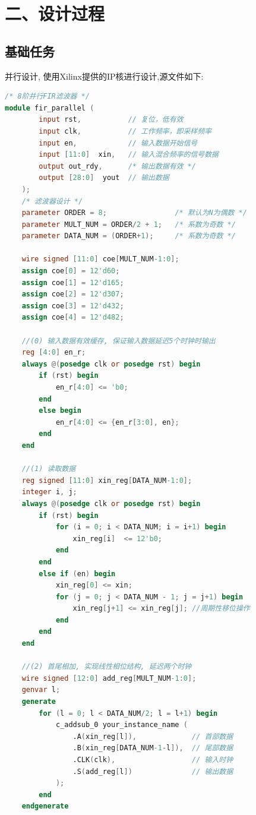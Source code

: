 \documentclass{article}
\newcommand{\fourhao}{\fontsize{14pt}{\baselineskip}\selectfont} %
\newcommand{\xiaosihao}{\fontsize{12pt}{\baselineskip}\selectfont} %
\begin{document}
\section*{\fourhao 二、设计过程}
\xiaosihao
{}
\subsection*{基础任务}
并行设计, 使用Xilinx提供的IP核进行设计,源文件如下:
\begin{lstlisting}[language=Verilog, caption={并行八阶FIR滤波器}]
/* 8阶并行FIR滤波器 */
module fir_parallel (
        input rst,           // 复位，低有效
        input clk,           // 工作频率，即采样频率
        input en,            // 输入数据开始信号
        input [11:0]  xin,   // 输入混合频率的信号数据
        output out_rdy,      /* 输出数据有效 */
        output [28:0]  yout  // 输出数据
    );
    /* 滤波器设计 */
    parameter ORDER = 8;                /* 默认为N为偶数 */
    parameter MULT_NUM = ORDER/2 + 1;   /* 系数为奇数 */
    parameter DATA_NUM = (ORDER+1);     /* 系数为奇数 */

    wire signed [11:0] coe[MULT_NUM-1:0];
    assign coe[0] = 12'd60;
    assign coe[1] = 12'd165;
    assign coe[2] = 12'd307;
    assign coe[3] = 12'd432;
    assign coe[4] = 12'd482;

    //(0) 输入数据有效缓存, 保证输入数据延迟5个时钟时输出
    reg [4:0] en_r;
    always @(posedge clk or posedge rst) begin
        if (rst) begin
            en_r[4:0] <= 'b0;
        end
        else begin
            en_r[4:0] <= {en_r[3:0], en};
        end
    end

    //(1) 读取数据
    reg signed [11:0] xin_reg[DATA_NUM-1:0];
    integer i, j;
    always @(posedge clk or posedge rst) begin
        if (rst) begin
            for (i = 0; i < DATA_NUM; i = i+1) begin
                xin_reg[i]  <= 12'b0;
            end
        end
        else if (en) begin
            xin_reg[0] <= xin;
            for (j = 0; j < DATA_NUM - 1; j = j+1) begin
                xin_reg[j+1] <= xin_reg[j]; //周期性移位操作
            end
        end
    end

    //(2) 首尾相加, 实现线性相位结构, 延迟两个时钟
    wire signed [12:0] add_reg[MULT_NUM-1:0];
    genvar l;
    generate
        for (l = 0; l < DATA_NUM/2; l = l+1) begin
            c_addsub_0 your_instance_name (
                .A(xin_reg[l]),             // 首部数据
                .B(xin_reg[DATA_NUM-1-l]),  // 尾部数据
                .CLK(clk),                  // 输入时钟
                .S(add_reg[l])              // 输出数据
            );
        end
    endgenerate


\end{lstlisting}
\end{document}
